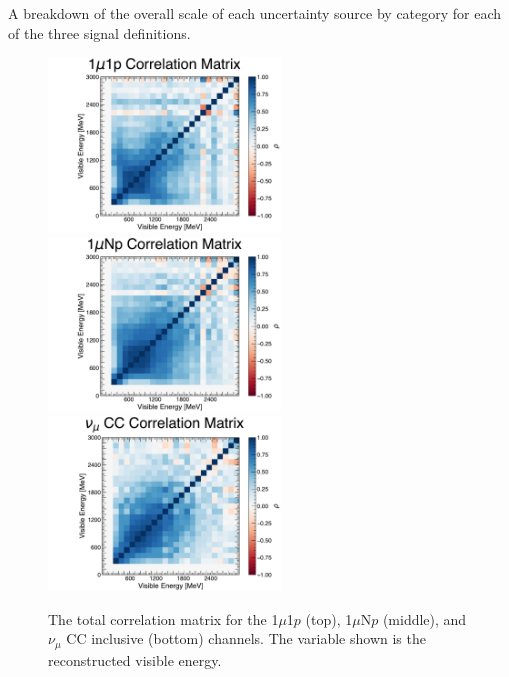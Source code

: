 \begin{table}
    \centering
    \caption{A breakdown of the overall scale of each uncertainty source by category for each of the three signal definitions.}
    \resizebox{0.99\textwidth}{!}{}
    \label{tab:overall_systematics}
\end{table}

\begin{figure}
    \centering
    \includegraphics[width=0.55\textwidth]{figures/systematics/correlations_1mu1p.pdf} \\
    \includegraphics[width=0.55\textwidth]{figures/systematics/correlations_1muNp.pdf} \\
    \includegraphics[width=0.55\textwidth]{figures/systematics/correlations_1muX.pdf} \\
    \caption{The total correlation matrix for the 1$\mu$1$p$ (top), 1$\mu$N$p$ (middle), and $\nu_\mu$ CC inclusive (bottom) channels. The variable shown is the reconstructed visible energy.}
    \label{fig:correlation_matrices}
\end{figure}

